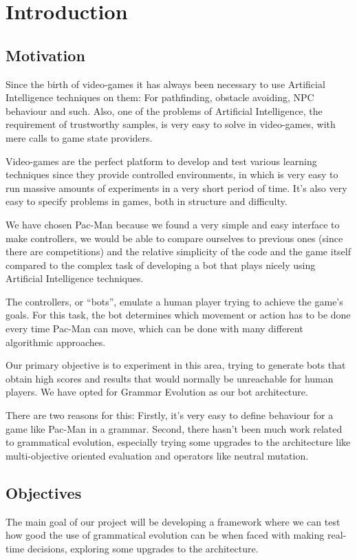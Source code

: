 \chapter{Introduction}

\section{Motivation}
Since the birth of video-games it has always been necessary to use Artificial Intelligence techniques on them: For pathfinding, obstacle avoiding, NPC behaviour and such. Also, one of the problems of Artificial Intelligence, the requirement of trustworthy samples, is very easy to solve in video-games, with mere calls to game state providers.

Video-games are the perfect platform to develop and test various learning techniques since they provide controlled environments, in which is very easy to run massive amounts of experiments in a very short period of time. It’s also very easy to specify problems in games, both in structure and difficulty.
 
We have chosen Pac-Man because we found a very simple and easy interface to make controllers, we would be able to compare ourselves to previous ones (since there are competitions) and the relative simplicity of the code and the game itself compared to the complex task of developing a bot that plays nicely using Artificial Intelligence techniques.
 
The controllers, or “bots”, emulate a human player trying to achieve the game’s goals. For this task, the bot determines which movement or action has to be done every time Pac-Man can move, which can be done with many different algorithmic approaches.
 
Our primary objective is to experiment in this area, trying to generate bots that obtain high scores and results that would normally be unreachable for human players. We have opted for Grammar Evolution as our bot architecture.

There are two reasons for this: Firstly, it’s very easy to define behaviour for a game like Pac-Man in a grammar. Second, there hasn’t been much work related to grammatical evolution, especially trying some upgrades to the architecture like multi-objective oriented evaluation and operators like neutral mutation. 

\section{Objectives}
The main goal of our project will be developing a framework where we can test how good the use of grammatical evolution can be when faced with making real-time decisions, exploring some upgrades to the architecture.

